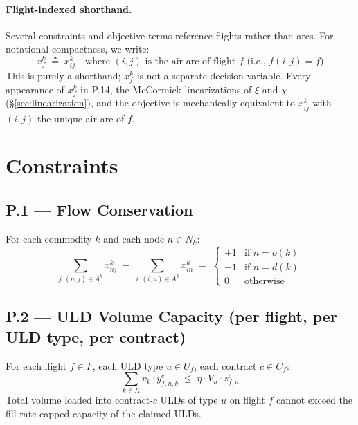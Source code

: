 \documentclass[11pt,a4paper]{article}
\newcommand{\defeq}{\triangleq}
\theoremstyle{definition}
\begin{document}
\paragraph{Flight-indexed shorthand.}
Several constraints and objective terms reference flights rather than arcs. For
notational compactness, we write:
\begin{equation}
  x_f^k \;\defeq\; x_{ij}^k \quad \text{where } (i,j) \text{ is the air arc of flight } f
                            \text{ (i.e., } f(i,j) = f \text{)}
  \label{eq:x-flight-shorthand}
\end{equation}
This is purely a shorthand; $x_f^k$ is not a separate decision variable. Every
appearance of $x_f^k$ in P.14, the McCormick linearizations of $\xi$ and $\chi$
(\S\ref{sec:linearization}), and the objective is mechanically equivalent to
$x_{ij}^k$ with $(i,j)$ the unique air arc of $f$.

\section{Constraints}
\label{sec:constraints}

\subsection*{P.1 — Flow Conservation}

For each commodity $k$ and each node $n \in N_k$:
\begin{equation}
  \sum_{j : (n,j) \in A^k} x_{nj}^k \;-\; \sum_{i : (i,n) \in A^k} x_{in}^k
  \;=\;
  \begin{cases}
    +1 & \text{if } n = o(k) \\
    -1 & \text{if } n = d(k) \\
    0  & \text{otherwise}
  \end{cases}
  \label{eq:P1}
\end{equation}

\subsection*{P.2 — ULD Volume Capacity (per flight, per ULD type, per contract)}

For each flight $f \in F$, each ULD type $u \in U_f$, each contract $c \in C_f$:
\begin{equation}
  \sum_{k \in K} v_k \cdot y_{f,u,k}^c \;\leq\; \eta \cdot V_u \cdot z_{f,u}^c
  \label{eq:P2}
\end{equation}
Total volume loaded into contract-$c$ ULDs of type $u$ on flight $f$ cannot exceed the fill-rate-capped
capacity of the claimed ULDs.
\end{document}
